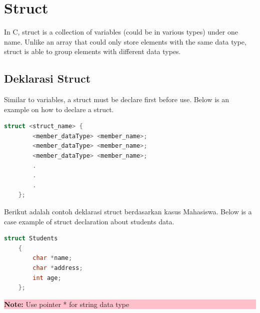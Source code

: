 \section{Struct}
In C, struct is a collection of variables (could be in various types) under one name. Unlike an array that could only
store elements with the same data type, struct is able to group elements with different data types.

\subsection{Deklarasi Struct}
Similar to variables, a struct must be declare first before use. Below is an example on how to declare a struct.

\begin{lstlisting}[language=c]
    struct <struct_name> {
        <member_dataType> <member_name>;
        <member_dataType> <member_name>;
        <member_dataType> <member_name>;
        .
        .
        .
    };
    \end{lstlisting}

Berikut adalah contoh deklarasi struct berdasarkan kasus Mahasiswa.
Below is a case example of struct declaration about students data.
\begin{lstlisting}[language=c]
    struct Students
    {
        char *name;
        char *address;
        int age;
    };
    \end{lstlisting}
\begin{center}
	\colorbox{pink}{\parbox{0.8\linewidth}{\textbf{Note:}  Use pointer * for string data type}}
\end{center}

